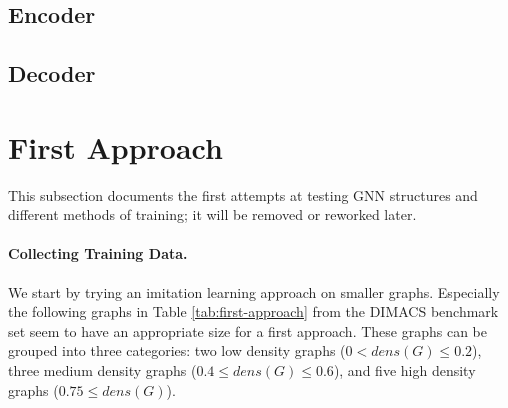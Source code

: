 \documentclass[draft,final]{vutinfth} %
\begin{document}

\subsection{Encoder}

\subsection{Decoder}


\section{First Approach}
This subsection documents the first attempts at testing GNN structures and different methods of training; it will be removed or reworked later.

\paragraph{Collecting Training Data.} We start by trying an imitation learning approach on smaller graphs. Especially the following graphs in Table \ref{tab:first-approach} from the DIMACS benchmark set seem to have an appropriate size for a first approach. 
These graphs can be grouped into three categories: two low density graphs ($0 < \mathit{dens}(G) \leq 0.2$), three medium density graphs ($0.4 \leq \mathit{dens}(G) \leq 0.6$), and five high density graphs ($0.75 \leq \mathit{dens}(G)$). 
\end{document}
